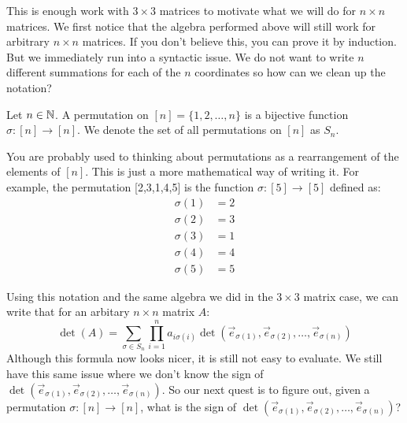 This is enough work with $3\times 3$ matrices to motivate what we will do for $n\times n$ matrices. We first notice that the algebra performed above will still work for arbitrary $n\times n$ matrices. If you don't believe this, you can prove it by induction. But we immediately run into a syntactic issue. We do not want to write $n$ different summations for each of the $n$ coordinates so how can we clean up the notation?
\begin{definition}
    Let $n\in\mathbb{N}$. A permutation on $[n]=\{1,2,\dots,n\}$ is a bijective function $\sigma:[n]\to [n]$. We denote the set of all permutations on $[n]$ as $S_n$.
\end{definition}
\begin{remark}
    You are probably used to thinking about permutations as a rearrangement of the elements of $[n]$. This is just a more mathematical way of writing it. For example, the permutation [2,3,1,4,5] is the function $\sigma:[5]\to[5]$ defined as:
    \begin{align*}
        \sigma(1)&=2\\
        \sigma(2)&=3\\
        \sigma(3)&=1\\
        \sigma(4)&=4\\
        \sigma(5)&=5
    \end{align*}
\end{remark}
Using this notation and the same algebra we did in the $3\times 3$ matrix case, we can write that for an arbitary $n\times n$ matrix $A$:
$$\det(A)=\sum_{\sigma\in S_n}\prod_{i=1}^na_{i\sigma(i)}\det(\vec{e}_{\sigma(1)},\vec{e}_{\sigma(2)},\dots,\vec{e}_{\sigma(n)})$$
Although this formula now looks nicer, it is still not easy to evaluate. We still have this same issue where we don't know the sign of $\det(\vec{e}_{\sigma(1)},\vec{e}_{\sigma(2)},\dots,\vec{e}_{\sigma(n)})$. So our next quest is to figure out, given a permutation $\sigma:[n]\to[n]$, what is the sign of $\det(\vec{e}_{\sigma(1)},\vec{e}_{\sigma(2)},\dots,\vec{e}_{\sigma(n)})$?
